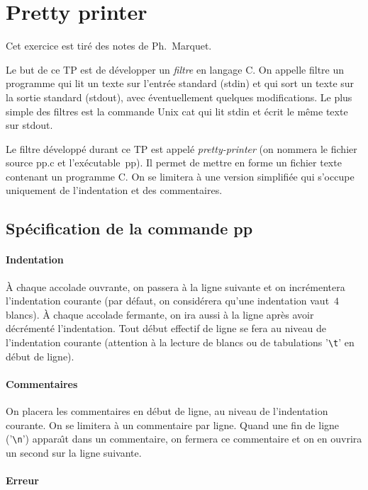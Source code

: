 \documentclass[12pts]{article}
\begin{document}
\section{Pretty printer}

Cet exercice est tir\'e des notes de Ph.~Marquet.

Le but de ce TP est de d\'evelopper un \textit{filtre} en langage C. On
appelle filtre un programme qui lit un texte sur l'entr\'ee standard
(stdin) et qui sort un texte sur la sortie standard (stdout), avec
\'eventuellement quelques modifications. Le plus simple des filtres est
la commande Unix cat qui lit stdin et \'ecrit le m\^eme texte sur stdout.

Le filtre d\'evelopp\'e durant ce TP est appel\'e \textit{pretty-printer}
(on nommera le fichier source pp.c et l'ex\'ecutable~pp). Il permet de
mettre en forme un fichier texte contenant un programme C. On se
limitera \`a une version simplifi\'ee qui s'occupe uniquement de
l'indentation et des commentaires.


\subsection{Sp\'ecification de la commande pp}
\paragraph{Indentation}


\`A chaque accolade ouvrante, on passera \`a la ligne suivante et on
incr\'ementera l'indentation courante (par d\'efaut, on consid\'erera
qu'une indentation vaut~$4$ blancs). \`A chaque accolade fermante, on
ira aussi \`a la ligne apr\`es avoir d\'ecr\'ement\'e l'indentation.
Tout d\'ebut effectif de ligne se fera au niveau de l'indentation
courante (attention \`a la lecture de blancs ou de tabulations
'\verb?\t?' en d\'ebut de ligne).


\paragraph{Commentaires}

On placera les commentaires en d\'ebut de ligne, au niveau de
l'indentation courante. On se limitera \`a un commentaire par ligne.
Quand une fin de ligne ('\verb?\n?') appara\^\i{}t dans un commentaire, on
fermera ce commentaire et on en ouvrira un second sur la ligne
suivante.


\paragraph{Erreur}
\end{document}
